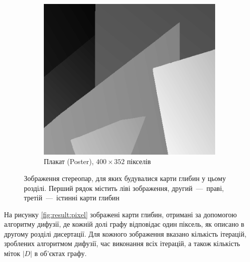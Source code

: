 \begin{figure}[h]
\begin{subfigure}[t]{0.32\textwidth}
    \end{subfigure}
    \hfill
    \begin{subfigure}[t]{0.32\textwidth}
        \centering
        \includegraphics[width=\textwidth]{images/poster_ground_truth}
        \caption{Плакат (Poster), $400 \times 352$ пікселів}
    \end{subfigure}
    \caption{Зображення стереопар,
             для яких будувалися карти глибин у цьому розділі.
             Перший рядок містить ліві зображення, другий~---~праві,
             третій~---~істинні карти глибин}
    \label{fig:stereopair}
\end{figure}

На рисунку \ref{fig:result:pixel} зображені карти глибин,
отримані за допомогою алгоритму дифузії,
де кожній долі графу відповідає один піксель,
як описано в другому розділі дисертації.
Для кожного зображення вказано кількість ітерацій, зроблених алгоритмом дифузії,
час виконання всіх ітерацій, а також кількість міток $\left| D \right|$ в об'єктах графу.

